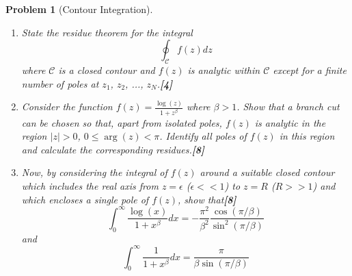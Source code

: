 \documentclass[a4paper]{article}
\theoremstyle{new}
\newtheorem{qns}{Problem}[section]
\begin{document}
\newpage
\begin{qns}[Contour Integration]\leavevmode
\begin{enumerate}[label=(\roman*)]
\item State the residue theorem for the integral
$$\oint_{\mathcal{C}}f(z)dz$$
where $\mathcal{C}$ is a closed contour and $f(z)$ is analytic within $\mathcal{C}$ except for a finite number of poles at $z_1$, $z_2$, ..., $z_N$.\hfill\textbf{[4]}
\item Consider the function $f(z)=\frac{\log(z)}{1+z^\beta}$ where $\beta>1$. Show that a branch cut can be chosen so that, apart from isolated poles, $f(z)$ is analytic in the region $|z| > 0$, $0\leq\arg(z)<\pi$. Identify all poles of $f(z)$ in this region and calculate the corresponding residues.\hfill\textbf{[8]}
\item Now, by considering the integral of $f(z)$ around a suitable closed contour which includes the real axis from $z=\epsilon$ ($\epsilon<<1$) to $z=R$ ($R>>1$) and which encloses a single pole of $f(z)$, show that\hfill\textbf{[8]}
$$\int_0^\infty\frac{\log(x)}{1+x^\beta}dx=-\frac{\pi^2}{\beta^2}\frac{\cos(\pi/\beta)}{\sin^2(\pi/\beta)}$$
and
$$\int_0^\infty\frac{1}{1+x^\beta}dx=\frac{\pi}{\beta\sin(\pi/\beta)}$$
\end{enumerate}
\end{qns}
\end{document}
